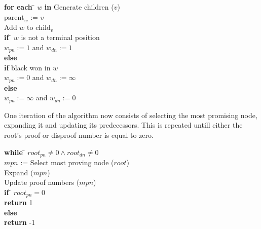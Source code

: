 \documentclass{article}
\begin{document}
\begin{minipage}{\textwidth}
\begin{algorithm}[Expand ($v$)]
\hfill\par
\begin{tabbing}
  \textbf{for each} \= $w$ \textbf{in} Generate children ($v$)\\
  \> $\text{parent}_w$ := $v$\\
  \> Add $w$ to $\text{child}_v$\\
  \> \textbf{if} \= $w$ is not a terminal position\\
  \> \> $w_{pn} := 1$ and $w_{dn} := 1$\\
  \> \textbf{else}\\
  \> \> \textbf{if} \= black won in $w$\\
  \> \> \> $w_{pn} := 0$ and $w_{dn} := \infty$\\
  \> \> \textbf{else}\\
  \> \> \> $w_{pn} := \infty$ and $w_{dn} := 0$\\
\end{tabbing}
\end{algorithm}
\end{minipage}

One iteration of the algorithm now consists of selecting the most promising node, expanding it and updating its predecessors.
This is repeated untill either the root's proof or disproof number is equal to zero.

\begin{minipage}{\textwidth}
\begin{algorithm}
\hfill\par
\begin{tabbing}
  \textbf{while} \= $root_{pn} \not= 0 \land root_{dn} \not= 0$\\
  \> $mpn$ := Select most proving node ($root$) \\
  \> Expand ($mpn$)\\
  \> Update proof numbers ($mpn$)\\
  \textbf{if} \= $root_{pn} = 0$\\
  \> \textbf{return} 1\\
  \textbf{else}\\
  \> \textbf{return} -1\\
\end{tabbing}
\end{algorithm}
\end{minipage}
\end{document}
